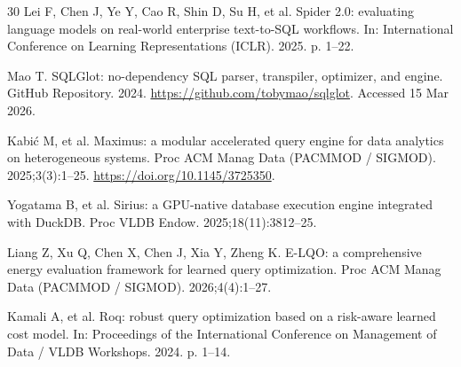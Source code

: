 \documentclass[10pt,a4paper]{article}
\begin{document}
{\begin{thebibliography}{30}
Lei F, Chen J, Ye Y, Cao R, Shin D, Su H, et al. Spider 2.0: evaluating language models on real-world enterprise text-to-SQL workflows. In: International Conference on Learning Representations (ICLR). 2025. p. 1--22.

Mao T. SQLGlot: no-dependency SQL parser, transpiler, optimizer, and engine. GitHub Repository. 2024. \url{https://github.com/tobymao/sqlglot}. Accessed 15 Mar 2026.

 Kabi\'{c} M, et al. Maximus: a modular accelerated query engine for data analytics on heterogeneous systems. Proc ACM Manag Data (PACMMOD / SIGMOD). 2025;3(3):1--25. \url{https://doi.org/10.1145/3725350}.

 Yogatama B, et al. Sirius: a GPU-native database execution engine integrated with DuckDB. Proc VLDB Endow. 2025;18(11):3812--25.

 Liang Z, Xu Q, Chen X, Chen J, Xia Y, Zheng K. E-LQO: a comprehensive energy evaluation framework for learned query optimization. Proc ACM Manag Data (PACMMOD / SIGMOD). 2026;4(4):1--27.

 Kamali A, et al. Roq: robust query optimization based on a risk-aware learned cost model. In: Proceedings of the International Conference on Management of Data / VLDB Workshops. 2024. p. 1--14.

\end{thebibliography}
}

\end{document}
